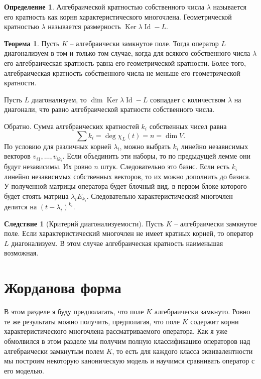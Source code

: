 \documentclass[10pt,a4paper,oneside]{book}
\theoremstyle{definition}
\newtheorem*{defn}{Определение}
\newtheorem{thm}{Теорема}
\newtheorem{cor}{Следствие}
\newcommand{\id}{\operatorname{Id}}
\DeclareMathOperator{\Ker}{Ker}
\def\thrm{\begin{thm}}
\def\ethrm{\end{thm}}
\def\dfn{\begin{defn}}
\def\edfn{\end{defn}}
\def\crl{\begin{cor}}
\def\ecrl{\end{cor}}
\begin{document}
\dfn Алгебраической кратностью собственного числа $\lambda$ называется его кратность как корня характеристического многочлена. Геометрической кратностью $\lambda$ называется размерность $\Ker \lambda \id - L$.
\edfn

\thrm Пусть $K$ -- алгебраически замкнутое поле.  Тогда оператор $L$ диагонализуем в том и только том случае, когда для всякого собственного числа $\lambda$ его алгебраическая кратность равна его геометрической кратности. Более того, алгебраическая кратность собственного числа не меньше его геометрической кратности.
\ethrm
\proof Пусть $L$ диагонализуем, то $\dim \Ker \lambda \id - L$ совпадает с количеством  $\lambda$ на диагонали, что равно алгебраической кратности собственного числа.

Обратно. Сумма алгебраических кратностей $k_i$ собственных чисел равна $$\sum k_i=\deg \chi_L(t)=n=\dim V.$$
По условию для различных корней $\lambda_i$, можно выбрать $k_i$ линейно независимых векторов $v_{i1},\dots,v_{ik_i}$. Если объединить эти наборы, то по предыдущей лемме они будут независимы. Их ровно $n$ штук. Следовательно это базис.
Если есть $k_i$ линейно независимых собственных векторов, то их можно дополнить до базиса. У полученной матрицы оператора будет блочный вид, в первом блоке которого будет стоять матрица $\lambda_iE_{k_i}$. Следовательно характеристический многочлен делится на $(t-\lambda_i)^{k_i}$.
\endproof



\crl[Критерий диагонализуемости] Пусть $K$ -- алгебраически замкнутое поле. Если характеристический многочлен не имеет кратных корней, то оператор $L$ диагонализуем.
\proof В этом случае алгебраическая кратность наименьшая возможная.
\endproof
\ecrl






\section{Жорданова форма}

В этом разделе я буду предполагать, что  поле $K$ алгебраически замкнуто. Ровно те же результаты можно получить, предполагая, что поле $K$ содержит корни характеристического многочлена рассматриваемого оператора. Как я уже обмолвился в этом разделе мы получим полную классификацию операторов над алгебраически замкнутым полем $K$, то есть для каждого класса эквивалентности мы построим некоторую каноническую модель и научимся сравнивать оператор с его моделью.
\end{document}

